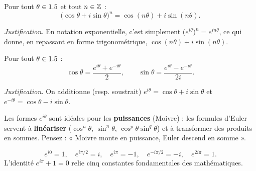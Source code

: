 \begin{illus}
\end{illus}

\begin{theoreme}
Pour tout $\theta\in1.5$ et tout $n\in\mathbb{Z}$ :
\[
\big(\cos\theta+i\sin\theta\big)^{n}=\cos(n\theta)+i\sin(n\theta).
\]
\end{theoreme}

\noindent\emph{Justification.} En notation exponentielle, c'est simplement
$\big(e^{i\theta}\big)^{n}=e^{in\theta}$, ce qui donne, en repassant en forme trigonométrique,
$\cos(n\theta)+i\sin(n\theta)$.

\begin{theoreme}
Pour tout $\theta\in1.5$ :
\[
\cos\theta=\frac{e^{i\theta}+e^{-i\theta}}{2},\qquad
\sin\theta=\frac{e^{i\theta}-e^{-i\theta}}{2i}.
\]
\end{theoreme}

\noindent\emph{Justification.} On additionne (resp. soustrait) $e^{i\theta}=\cos\theta+i\sin\theta$
et $e^{-i\theta}=\cos\theta-i\sin\theta$.

\begin{aretenir}
Les formes $e^{i\theta}$ sont idéales pour les \textbf{puissances} (Moivre) ; les formules d'Euler
servent à \textbf{linéariser} ($\cos^{n}\theta$, $\sin^{n}\theta$, $\cos^{p}\theta\sin^{q}\theta$)
et à transformer des produits en sommes. Pensez : « Moivre monte en puissance, Euler descend en
somme ».
\end{aretenir}

\begin{exemple}
\[
e^{i0}=1,\quad e^{i\pi/2}=i,\quad e^{i\pi}=-1,\quad e^{-i\pi/2}=-i,\quad e^{2i\pi}=1.
\]
L'identité $e^{i\pi}+1=0$ relie cinq constantes fondamentales des mathématiques.
\end{exemple}

